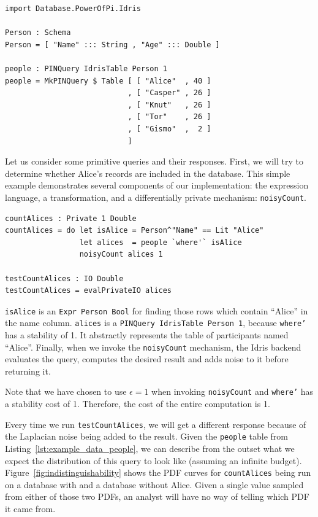 \documentclass[12pt]{report}
\begin{document}
\begin{lstlisting}[caption={Validation Data},label={lst:example_data_people}]
import Database.PowerOfPi.Idris

Person : Schema
Person = [ "Name" ::: String , "Age" ::: Double ]

people : PINQuery IdrisTable Person 1
people = MkPINQuery $ Table [ [ "Alice"  , 40 ]
                            , [ "Casper" , 26 ]
                            , [ "Knut"   , 26 ]
                            , [ "Tor"    , 26 ]
                            , [ "Gismo"  ,  2 ]
                            ]
\end{lstlisting}

Let us consider some primitive queries and their responses.
First, we will try to determine whether Alice's records are included in the database.
This simple example demonstrates several components of our implementation: the expression language, a transformation, and a differentially private mechanism: \texttt{noisyCount}.

\begin{lstlisting}[caption={Counting Alices},label={lst:counting_alices}]
countAlices : Private 1 Double
countAlices = do let isAlice = Person^"Name" == Lit "Alice"
                 let alices  = people `where'` isAlice
                 noisyCount alices 1

testCountAlices : IO Double
testCountAlices = evalPrivateIO alices
\end{lstlisting}

\texttt{isAlice} is an \texttt{Expr Person Bool} for finding those rows which contain ``Alice'' in the name column.
\texttt{alices} is a \texttt{PINQuery IdrisTable Person 1}, because \texttt{where'} has a stability of 1.
It abstractly represents the table of participants named ``Alice''.
Finally, when we invoke the \texttt{noisyCount} mechanism, the Idris backend evaluates the query, computes the desired result and adds noise to it before returning it.

Note that we have chosen to use $\epsilon = 1$ when invoking \texttt{noisyCount} and \texttt{where'} has a stability cost of 1.
Therefore, the cost of the entire computation is 1.

Every time we run \texttt{testCountAlices}, we will get a different response because of the Laplacian noise being added to the result.
Given the \texttt{people} table from Listing~\ref{lst:example_data_people}, we can describe from the outset what we expect the distribution of this query to look like (assuming an infinite budget).
Figure~\ref{fig:indistinguishability} shows the PDF curves for \texttt{countAlices} being run on a database with and a database without Alice.
Given a single value sampled from either of those two PDFs, an analyst will have no way of telling which PDF it came from.
\end{document}
